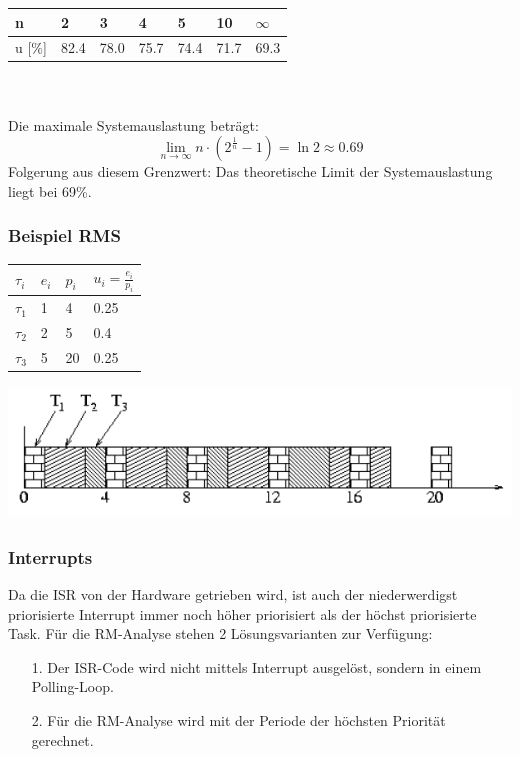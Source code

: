 \begin{tabular}{| l | l | l | l | l | l | l |}
	\hline
	n & 2 & 3 & 4 & 5 & 10 & $\infty$\\
	\hline
	u [\%] & 82.4 & 78.0 & 75.7 & 74.4 & 71.7 & 69.3 \\
	\hline
\end{tabular}\\\\
	
Die maximale Systemauslastung beträgt: 
\begin{equation}
\lim_{n \to \infty}n\cdot(2^\frac{1}{n}-1) = \ln 2 \approx 0.69
\end{equation}
Folgerung aus diesem Grenzwert: Das theoretische Limit der Systemauslastung
liegt bei 69\%. 
\subsubsection{Beispiel RMS}
\begin{minipage}[t]{4 cm}
	\begin{tabular}{| l | l | l | l |}
		\hline
		$\tau_i$ & $e_i$ & $p_i$ & $u_i=\frac{e_i}{p_i}$ \\
		\hline
		$\tau_1$ & 1 & 4 & 0.25 \\
		\hline
		$\tau_2$ & 2 & 5 & 0.4 \\
		\hline
		$\tau_3$ & 5 & 20 & 0.25 \\
		\hline
	\end{tabular}
\end{minipage} 
\begin{minipage}[c]{14 cm}		
	\includegraphics[height=3.5cm]{images/RT/RMS}
\end{minipage}

\subsubsection{Interrupts}
Da die ISR von der Hardware getrieben wird, ist auch der niederwerdigst priorisierte Interrupt
immer noch höher priorisiert als der höchst priorisierte Task. Für die RM-Analyse stehen 2 Lösungsvarianten zur Verfügung:
\begin{itemize}
  \item[1.]  Der ISR-Code wird nicht mittels Interrupt ausgelöst, sondern in einem Polling-Loop.
  \item[2.]  Für die RM-Analyse wird mit der Periode der höchsten Priorität gerechnet.
\end{itemize}

